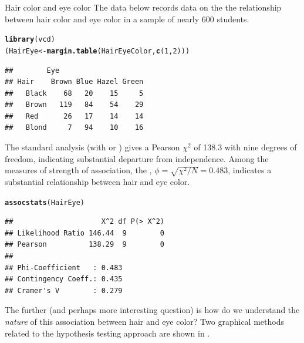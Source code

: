 \documentclass[11pt]{book}\usepackage[]{graphicx}\usepackage[]{color}
\makeatletter
\newcommand{\hlnum}[1]{\textcolor[rgb]{0.686,0.059,0.569}{#1}}%
\newcommand{\hlstd}[1]{\textcolor[rgb]{0.345,0.345,0.345}{#1}}%
\newcommand{\hlkwb}[1]{\textcolor[rgb]{0.69,0.353,0.396}{#1}}%
\newcommand{\hlkwd}[1]{\textcolor[rgb]{0.737,0.353,0.396}{\textbf{#1}}}%
\newenvironment{kframe}{%
 \def\at@end@of@kframe{}%
 \ifinner\ifhmode%
  \def\at@end@of@kframe{\end{minipage}}%
  \begin{minipage}{\columnwidth}%
 \fi\fi%
 \def\FrameCommand##1{\hskip\@totalleftmargin \hskip-\fboxsep
 \colorbox{shadecolor}{##1}\hskip-\fboxsep
     \hskip-\linewidth \hskip-\@totalleftmargin \hskip\columnwidth}%
 \MakeFramed {\advance\hsize-\width
   \@totalleftmargin\z@ \linewidth\hsize
   \@setminipage}}%
 {\par\unskip\endMakeFramed%
 \at@end@of@kframe}
\newenvironment{knitrout}{}{} %
\renewenvironment{knitrout}{\small\renewcommand{\baselinestretch}{.85}}{} %
\makeatother
\begin{document}
\begin{Example}[haireye0]{Hair color and eye color}
%
The data  below
records data on the the relationship between hair color and eye color
in a sample of nearly 600 students.
\begin{knitrout}
\color{fgcolor}\begin{kframe}
\begin{alltt}
\hlkwd{library}\hlstd{(vcd)}
\hlstd{(HairEye} \hlkwb{<-} \hlkwd{margin.table}\hlstd{(HairEyeColor,} \hlkwd{c}\hlstd{(}\hlnum{1}\hlstd{,} \hlnum{2}\hlstd{)))}
\end{alltt}
\begin{verbatim}
##        Eye
## Hair    Brown Blue Hazel Green
##   Black    68   20    15     5
##   Brown   119   84    54    29
##   Red      26   17    14    14
##   Blond     7   94    10    16
\end{verbatim}
\end{kframe}
\end{knitrout}


The standard analysis (with  or )
gives a 
Pearson \(\chi^2\) of 138.3 with nine degrees of freedom,
indicating substantial departure from independence.  Among the measures of
strength of association, the ,
$\phi = \sqrt{\chi^2 / N} = 0.483$, indicates a substantial relationship
between hair and eye color.

\begin{knitrout}
\color{fgcolor}\begin{kframe}
\begin{alltt}
\hlkwd{assocstats}\hlstd{(HairEye)}
\end{alltt}
\begin{verbatim}
##                     X^2 df P(> X^2)
## Likelihood Ratio 146.44  9        0
## Pearson          138.29  9        0
## 
## Phi-Coefficient   : 0.483 
## Contingency Coeff.: 0.435 
## Cramer's V        : 0.279
\end{verbatim}
\end{kframe}
\end{knitrout}

The further (and perhaps more interesting question) is how do we
understand the \emph{nature} of this association between hair
and eye color?
Two graphical methods related to the hypothesis testing approach
are shown in .


\end{Example}
\end{document}
